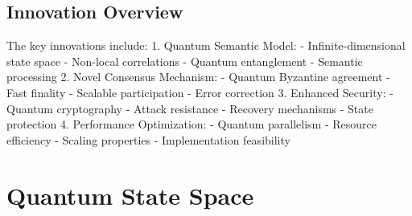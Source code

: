 \documentclass[12pt]{article}
\begin{document}
\subsection{Innovation Overview}
The key innovations include:
1. Quantum Semantic Model:
- Infinite-dimensional state space
- Non-local correlations
- Quantum entanglement
- Semantic processing
2. Novel Consensus Mechanism:
- Quantum Byzantine agreement
- Fast finality
- Scalable participation
- Error correction
3. Enhanced Security:
- Quantum cryptography
- Attack resistance
- Recovery mechanisms
- State protection
4. Performance Optimization:
- Quantum parallelism
- Resource efficiency
- Scaling properties
- Implementation feasibility
\section{Quantum State Space}
\end{document}
